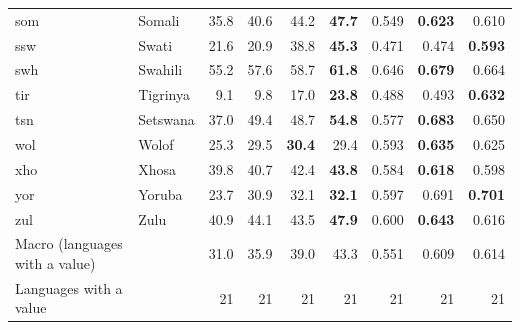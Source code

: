 {\begin{longtable}{@{}llrrrrrrr@{}}
som & Somali & 35.8 & 40.6 & 44.2 & \textbf{47.7} & 0.549 & \textbf{0.623} & 0.610 \\
ssw & Swati & 21.6 & 20.9 & 38.8 & \textbf{45.3} & 0.471 & 0.474 & \textbf{0.593} \\
swh & Swahili & 55.2 & 57.6 & 58.7 & \textbf{61.8} & 0.646 & \textbf{0.679} & 0.664 \\
tir & Tigrinya & 9.1 & 9.8 & 17.0 & \textbf{23.8} & 0.488 & 0.493 & \textbf{0.632} \\
tsn & Setswana & 37.0 & 49.4 & 48.7 & \textbf{54.8} & 0.577 & \textbf{0.683} & 0.650 \\
wol & Wolof & 25.3 & 29.5 & \textbf{30.4} & 29.4 & 0.593 & \textbf{0.635} & 0.625 \\
xho & Xhosa & 39.8 & 40.7 & 42.4 & \textbf{43.8} & 0.584 & \textbf{0.618} & 0.598 \\
yor & Yoruba & 23.7 & 30.9 & 32.1 & \textbf{32.1} & 0.597 & 0.691 & \textbf{0.701} \\
zul & Zulu & 40.9 & 44.1 & 43.5 & \textbf{47.9} & 0.600 & \textbf{0.643} & 0.616 \\
\midrule
Macro (languages with a value) &  & 31.0 & 35.9 & 39.0 & 43.3 & 0.551 & 0.609 & 0.614 \\
Languages with a value &  & 21 & 21 & 21 & 21 & 21 & 21 & 21 \\
\end{longtable}}


